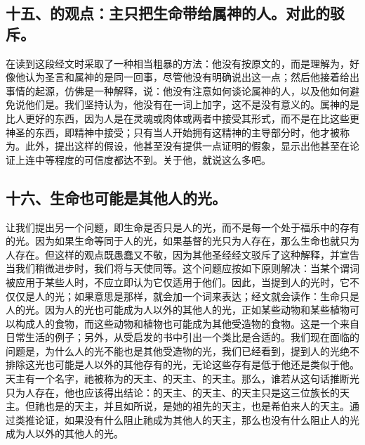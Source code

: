 
\subsection{十五、的观点：主只把生命带给属神的人。对此的驳斥。}

在读到这段经文时采取了一种相当粗暴的方法：他没有按原文的，而是理解为，好像他认为圣言和属神的是同一回事，尽管他没有明确说出这一点；然后他接着给出事情的起源，仿佛是一种解释，说：他没有注意如何谈论属神的人，以及他如何避免说他们是。我们坚持认为，他没有在一词上加字，这不是没有意义的。属神的是比人更好的东西，因为人是在灵魂或肉体或两者中接受其形式，而不是在比这些更神圣的东西，即精神中接受；只有当人开始拥有这精神的主导部分时，他才被称为。此外，提出这样的假设，他甚至没有提供一点证明的假象，显示出他甚至在论证上连中等程度的可信度都达不到。关于他，就说这么多吧。\par


\subsection{十六、生命也可能是其他人的光。}

让我们提出另一个问题，即生命是否只是人的光，而不是每一个处于福乐中的存有的光。因为如果生命等同于人的光，如果基督的光只为人存在，那么生命也就只为人存在。但这样的观点既愚蠢又不敬，因为其他圣经经文驳斥了这种解释，并宣告当我们稍微进步时，我们将与天使同等。这个问题应按如下原则解决：当某个谓词被应用于某些人时，不应立即认为它仅适用于他们。因此，当提到人的光时，它不仅仅是人的光；如果意思是那样，就会加一个词来表达；经文就会读作：生命只是人的光。因为人的光也可能成为人以外的其他人的光，正如某些动物和某些植物可以构成人的食物，而这些动物和植物也可能成为其他受造物的食物。这是一个来自日常生活的例子；另外，从受启发的书中引出一个类比是合适的。我们现在面临的问题是，为什么人的光不能也是其他受造物的光，我们已经看到，提到人的光绝不排除这光也可能是人以外的其他存有的光，无论这些存有是低于他还是类似于他。天主有一个名字，祂被称为的天主、的天主、的天主。那么，谁若从这句话推断光只为人存在，他也应该得出结论：的天主、的天主、的天主只是这三位族长的天主。但祂也是的天主，并且如所说，是她的祖先的天主，也是希伯来人的天主。通过类推论证，如果没有什么阻止祂成为其他人的天主，那么也没有什么阻止人的光成为人以外的其他人的光。\par

